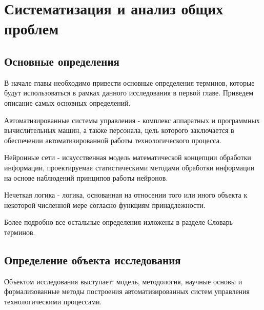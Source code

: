 \chapter{Систематизация и анализ общих проблем}\label{ch:ch1}

\section{Основные определения}\label{sec:ch1/sec1}
В начале главы необходимо привести основные определения терминов, которые будут использоваться в рамках данного исследования в первой главе. Приведем описание самых основных определений.


Автоматизированные системы управления - комплекс аппаратных и программных вычислительных машин, а также персонала, цель которого заключается в обеспечении автоматизированной работы технологического процесса.

Нейронные сети - искусственная модель математической концепции обработки информации, проектируемая статистическими методами обработки информации на основе наблюдений принципов работы нейронов.

Нечеткая логика - логика, основанная на относении того или иного объекта к некоторой численной мере согласно функциям принадлежности.

Более подробно все остальные определения изложены в разделе Словарь терминов.

\section{Определение объекта исследования}\label{sec:ch1/sec2}
Объектом исследования выступает: модель, методология, научные основы и формализованные методы построения автоматизированных систем управления технологическими процессами. 

